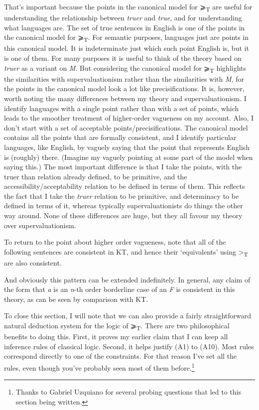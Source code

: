 \documentclass[
  11pt,
  letterpaper,
  DIV=11,
  numbers=noendperiod,
  twoside]{scrartcl}
\begin{document}
That's important because the points in the canonical model for
⩾\textsubscript{T} are useful for understanding the relationship between
\emph{truer} and \emph{true}, and for understanding what languages are.
The set of true sentences in English is one of the points in the
canonical model for ⩾\textsubscript{T}. For semantic purposes, languages
just are points in this canonical model. It is indeterminate just which
such point English is, but it is one of them. For many purposes it is
useful to think of the theory based on \emph{truer} as a variant on
\emph{M}. But considering the canonical model for ⩾\textsubscript{T}
highlights the similarities with supervaluationism rather than the
similarities with \emph{M}, for the points in the canonical model look a
lot like precisifications. It is, however, worth noting the many
differences between my theory and supervaluationism. I identify
languages with a single point rather than with a set of points, which
leads to the smoother treatment of higher-order vagueness on my account.
Also, I don't start with a set of acceptable points/precisifications.
The canonical model contains all the points that are formally
consistent, and I identify particular languages, like English, by
vaguely saying that the point that represents English is (roughly)
there. (Imagine my vaguely pointing at some part of the model when
saying this.) The most important difference is that I take the points,
with the truer than relation already defined, to be primitive, and the
accessibility/acceptability relation to be defined in terms of them.
This reflects the fact that I take the \emph{truer} relation to be
primitive, and determinacy to be defined in terms of it, whereas
typically supervaluationists do things the other way around. None of
these differences are huge, but they all favour my theory over
supervaluationism.

To return to the point about higher order vagueness, note that all of
the following sentences are consistent in KT, and hence their
`equivalents' using \textgreater{}\textsubscript{T} are also consistent.

And obviously this pattern can be extended indefinitely. In general, any
claim of the form that \emph{a} is an \emph{n}-th order borderline case
of an \emph{F} is consistent in this theory, as can be seen by
comparison with KT.

To close this section, I will note that we can also provide a fairly
straightforward natural deduction system for the logic of
⩾\textsubscript{T}. There are two philosophical benefits to doing this.
First, it proves my earlier claim that I can keep all inference rules of
classical logic. Second, it helps justify (A1) to (A10). Most rules
correspond directly to one of the constraints. For that reason I've set
all the rules, even though you've probably seen most of them
before.\footnote{Thanks to Gabriel Uzquiano for several probing
  questions that led to this section being written.}
\end{document}
